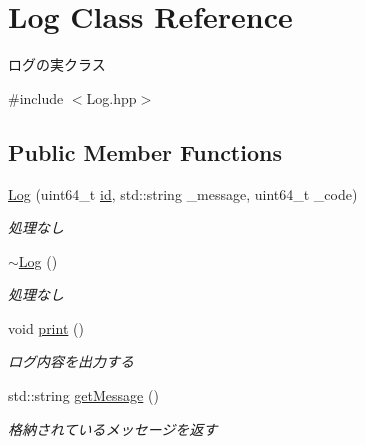 \hypertarget{class_log}{}\section{Log Class Reference}
\label{class_log}


ログの実クラス  




{\ttfamily \#include $<$Log.\+hpp$>$}

\subsection*{Public Member Functions}
\begin{DoxyCompactItemize}
\item 
\mbox{\label{class_log_acb4351188f0e89336ef1ea6db95bc141}} 
\mbox{\hyperlink{class_log_acb4351188f0e89336ef1ea6db95bc141}{Log}} (uint64\+\_\+t \mbox{\hyperlink{class_log_a75367c02e3a2226b169cb8940f711fde}{id}}, std\+::string \+\_\+message, uint64\+\_\+t \+\_\+code)
\begin{DoxyCompactList}\small\item\em 処理なし \end{DoxyCompactList}\item 
\mbox{\label{class_log_a0fbfda88fbee5027c89f6eb121059360}} 
\mbox{\hyperlink{class_log_a0fbfda88fbee5027c89f6eb121059360}{$\sim$\+Log}} ()
\begin{DoxyCompactList}\small\item\em 処理なし \end{DoxyCompactList}\item 
void \mbox{\hyperlink{class_log_ac765b7cc014cf47218adb2fd5f48a13f}{print}} ()
\begin{DoxyCompactList}\small\item\em ログ内容を出力する \end{DoxyCompactList}\item 
\mbox{\label{class_log_a3552b24cf47826b692e782074418a273}} 
std\+::string \mbox{\hyperlink{class_log_a3552b24cf47826b692e782074418a273}{get\+Message}} ()
\begin{DoxyCompactList}\small\item\em 格納されているメッセージを返す \end{DoxyCompactList}\item 
\mbox{\label{class_log_afb03ed79ec74b835e56c102b43283dcc}} 

\end{DoxyCompactItemize}
